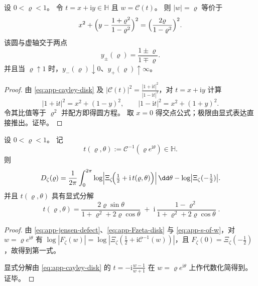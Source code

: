 \begin{proposition}[\texorpdfstring{$|w|=\varrho$}{|w|=varrho} 的 Cayley 逆像为一条显式圆]\label{prop:app-cayley-preimage-modulus-circle}
设 \(0<\varrho<1\)。
令 \(t=x+\mathrm{i}y\in\mathbb{H}\) 且 \(w=\mathcal{C}(t)\)。
则 \(|w|=\varrho\) 等价于
\[
x^2+\Bigl(y-\frac{1+\varrho^2}{1-\varrho^2}\Bigr)^2=\Bigl(\frac{2\varrho}{1-\varrho^2}\Bigr)^2.
\]
该圆与虚轴交于两点
\[
y_{\pm}(\varrho)=\frac{1\pm\varrho}{1\mp\varrho}.
\]
并且当 \(\varrho\uparrow 1\) 时，\(y_{-}(\varrho)\downarrow 0\)、\(y_{+}(\varrho)\uparrow\infty\)。
\end{proposition}
\begin{proof}
由 \eqref{eq:app-cayley-disk} 及 \(|\mathcal{C}(t)|^2=\frac{|1+\mathrm{i}t|^2}{|1-\mathrm{i}t|^2}\)，对 \(t=x+\mathrm{i}y\) 计算
\[
|1+\mathrm{i}t|^2=x^2+(1-y)^2,
\qquad
|1-\mathrm{i}t|^2=x^2+(1+y)^2.
\]
令其比值等于 \(\varrho^2\) 并配方即得圆方程。
取 \(x=0\) 得交点公式；极限由显式表达直接推出。证毕。
\end{proof}

\begin{proposition}[缺陷的上半平面圆平均表示与显式参数化]\label{prop:app-jensen-defect-upperhalf-circle-average}
设 \(0<\varrho<1\)。
记
\[
t(\varrho,\theta):=\mathcal{C}^{-1}(\varrho e^{\mathrm{i}\theta})\in\mathbb{H}.
\]
则
\[
D_{\zeta}(\varrho)
=\frac{1}{2\pi}\int_{0}^{2\pi}\log\Bigl|\Xi_{\zeta}\!\Bigl(\tfrac12+\mathrm{i}\,t(\varrho,\theta)\Bigr)\Bigr|\,\dd\theta
-\log\bigl|\Xi_{\zeta}(-\tfrac12)\bigr|.
\]
并且 \(t(\varrho,\theta)\) 具有显式分解
\begin{equation}\label{eq:app-t-rho-theta-explicit}
\boxed{\;
t(\varrho,\theta)
=\frac{2\varrho\sin\theta}{1+\varrho^2+2\varrho\cos\theta}
\;+\;
\mathrm{i}\,\frac{1-\varrho^2}{1+\varrho^2+2\varrho\cos\theta}\; }.
\end{equation}
\end{proposition}
\begin{proof}
由 \eqref{eq:app-jensen-defect}、\eqref{eq:app-Fzeta-disk} 与 \eqref{eq:app-s-of-w}，对 \(w=\varrho e^{\mathrm{i}\theta}\) 有
\(
\log|F_{\zeta}(w)|=\log|\Xi_{\zeta}(\tfrac12+\mathrm{i}\mathcal{C}^{-1}(w))|
\)，且 \(F_{\zeta}(0)=\Xi_{\zeta}(-\tfrac12)\)，故得到第一式。
\par
显式分解由 \eqref{eq:app-cayley-disk} 的 \(t=-\mathrm{i}\frac{w-1}{w+1}\) 在 \(w=\varrho e^{\mathrm{i}\theta}\) 上作代数化简得到。证毕。
\end{proof}

